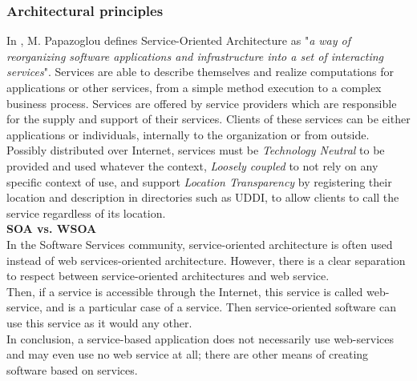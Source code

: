 \subsubsection{Architectural principles}

In \cite{Papazoglou:2003}, M. Papazoglou defines Service-Oriented Architecture as "{\it a way of reorganizing software applications and infrastructure into a set of interacting services}". Services are able to describe themselves and realize computations for applications or other services, from a simple method execution to a complex business process. Services are offered by service providers which are responsible for the supply and support of their services. Clients of these services can be either applications or individuals, internally to the organization or from outside.\\
Possibly distributed over Internet, services must be {\it Technology Neutral} to be provided and used whatever the context, {\it Loosely coupled} to not rely on any specific context of use, and support {\it Location Transparency} by registering their location and description in directories such as UDDI, to allow clients to call the service regardless of its location.\\


{\bf SOA vs. WSOA}\\
In the Software Services community, service-oriented architecture is often used instead of web services-oriented architecture. However, there is a clear separation to respect between service-oriented architectures and web service.\\
Then, if a service is accessible through the Internet, this service is called web-service, and is a particular case of a service. Then service-oriented software can use this service as it would any other. \\
In conclusion, a service-based application does not necessarily use web-services and may even use no web service at all; there are other means of creating software based on services.\\

